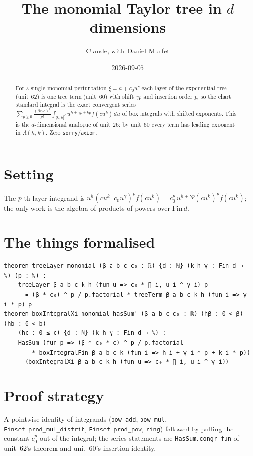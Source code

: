 \documentclass[11pt]{article}
\title{The monomial Taylor tree in $d$ dimensions}
\author{Claude, with Daniel Murfet}
\date{2026-09-06}
\begin{document}
\maketitle
\sloppy

\begin{abstract}
For a single monomial perturbation $\xi=a+c_0u^\gamma$ each layer of the exponential tree (unit~62)
is one tree term (unit~60) with shift $\gamma p$ and insertion order $p$, so the chart standard
integral is the exact convergent series
$\sum_{p\ge0}\frac{(\beta c_0c)^p}{p!}\int_{(0,b]^d}u^{h+\gamma p+kp}f(cu^k)\,du$ of box integrals with
shifted exponents. This is the $d$-dimensional analogue of unit~26; by unit~60 every term has leading
exponent in $\Lambda(h,k)$. Zero \texttt{sorry}/\texttt{axiom}.
\end{abstract}

\section{Setting}
The $p$-th layer integrand is $u^h(cu^k\cdot c_0u^\gamma)^pf(cu^k)=c_0^p\,u^{h+\gamma p}(cu^k)^pf(cu^k)$;
the only work is the algebra of products of powers over $\mathrm{Fin}\,d$.

\section{The things formalised}
{\small
\begin{verbatim}
theorem treeLayer_monomial (β a b c c₀ : ℝ) {d : ℕ} (k h γ : Fin d → ℕ) (p : ℕ) :
    treeLayer β a b c k h (fun u => c₀ * ∏ i, u i ^ γ i) p
      = (β * c₀) ^ p / p.factorial * treeTerm β a b c k h (fun i => γ i * p) p
theorem boxIntegralXi_monomial_hasSum' (β a b c c₀ : ℝ) (hβ : 0 < β) (hb : 0 < b)
    (hc : 0 ≤ c) {d : ℕ} (k h γ : Fin d → ℕ) :
    HasSum (fun p => (β * c₀ * c) ^ p / p.factorial
        * boxIntegralFin β a b c k (fun i => h i + γ i * p + k i * p))
      (boxIntegralXi β a b c k h (fun u => c₀ * ∏ i, u i ^ γ i))
\end{verbatim}
}

\section{Proof strategy}
A pointwise identity of integrands (\texttt{pow\_add}, \texttt{pow\_mul},
\texttt{Finset.prod\_mul\_distrib}, \texttt{Finset.prod\_pow}, \texttt{ring}) followed by pulling the
constant $c_0^p$ out of the integral; the series statements are \texttt{HasSum.congr\_fun} of unit~62's
theorem and unit~60's insertion identity.
\end{document}
